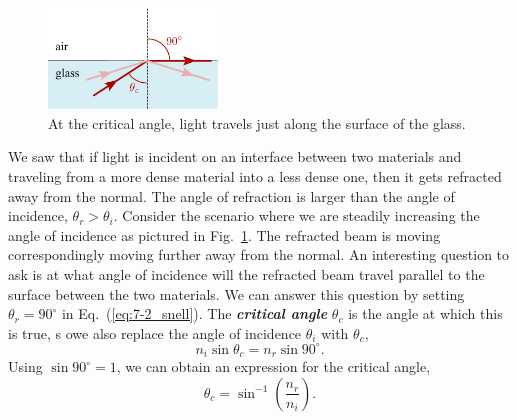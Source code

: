 \begin{figure}
    \centering
    \includegraphics[width=0.4\textwidth]{lesson7/7-3_total_internal_reflection.pdf}
    \caption[Total internal reflection]{At the critical angle, light travels just along the surface of the glass.}
    \label{fig:7-3_total_internal_reflection}
\end{figure}
We saw that if light is incident on an interface between two materials and traveling from a more dense material into a less dense one, then it gets refracted away from the normal.
The angle of refraction is larger than the angle of incidence, $\theta_r > \theta_i$. Consider the scenario where we are steadily increasing the angle of incidence as pictured in Fig.~\ref{fig:7-3_total_internal_reflection}.
The refracted beam is moving correspondingly moving further away from the normal.
An interesting question to ask is at what angle of incidence will the refracted beam travel parallel to the surface between the two materials.
We can answer this question by setting $\theta_r=90^{\circ}$ in Eq.~(\ref{eq:7-2_snell}).
The \textit{\textbf{critical angle}} $\theta_c$ is the angle at which this is true, s owe also replace the angle of incidence $\theta_i$ with $\theta_c$,
\begin{equation}
    n_i \sin \theta_c = n_r \sin 90^{\circ}.
\end{equation}
Using $\sin 90^{\circ} = 1$, we can obtain an expression for the critical angle,
\begin{equation}
    \theta_c=\sin ^{-1}\left(\frac{n_r}{n_i}\right).
    \label{eq:7-3_crit_angle}
\end{equation}


